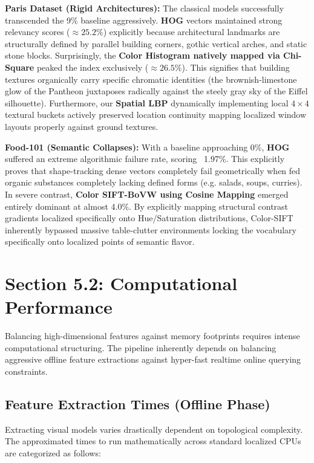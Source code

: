\documentclass[11pt, a4paper]{article}
\begin{document}
\textbf{Paris Dataset (Rigid Architectures):} The classical models successfully transcended the 9\% baseline aggressively. \textbf{HOG} vectors maintained strong relevancy scores ($\approx 25.2\%$) explicitly because architectural landmarks are structurally defined by parallel building corners, gothic vertical arches, and static stone blocks. Surprisingly, the \textbf{Color Histogram natively mapped via Chi-Square} peaked the index exclusively ($\approx 26.5\%$). This signifies that building textures organically carry specific chromatic identities (the brownish-limestone glow of the Pantheon juxtaposes radically against the steely gray sky of the Eiffel silhouette). Furthermore, our \textbf{Spatial LBP} dynamically implementing local $4 \times 4$ textural buckets actively preserved location continuity mapping localized window layouts properly against ground textures. 

\textbf{Food-101 (Semantic Collapses):} With a baseline approaching 0\%, \textbf{HOG} suffered an extreme algorithmic failure rate, scoring ~1.97\%. This explicitly proves that shape-tracking dense vectors completely fail geometrically when fed organic substances completely lacking defined forms (e.g. salads, soups, curries). In severe contrast, \textbf{Color SIFT-BoVW using Cosine Mapping} emerged entirely dominant at almost 4.0\%. By explicitly mapping structural contrast gradients localized specifically onto Hue/Saturation distributions, Color-SIFT inherently bypassed massive table-clutter environments locking the vocabulary specifically onto localized points of semantic flavor. 

\newpage
\section{Section 5.2: Computational Performance}
Balancing high-dimensional features against memory footprints requires intense computational structuring. The pipeline inherently depends on balancing aggressive offline feature extractions against hyper-fast realtime online querying constraints.

\subsection{Feature Extraction Times (Offline Phase)}
Extracting visual models varies drastically dependent on topological complexity. The approximated times to run mathematically across standard localized CPUs are categorized as follows:
\end{document}
